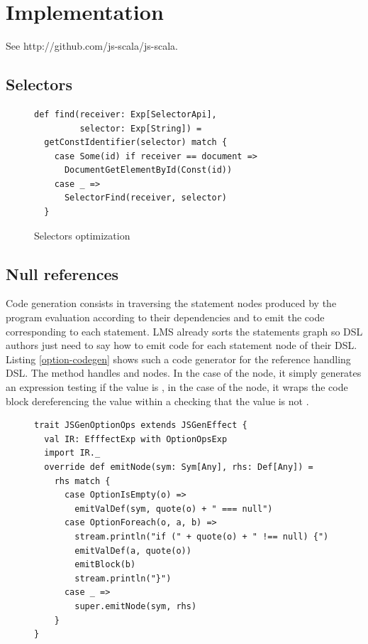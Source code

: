 \documentclass[preprint]{sigplanconf}
\begin{document}
\section{Implementation}
\label{implementation}

See http://github.com/js-scala/js-scala.

\subsection{Selectors}

\begin{figure}
\label{selector-impl}
\begin{lstlisting}
def find(receiver: Exp[SelectorApi],
         selector: Exp[String]) =
  getConstIdentifier(selector) match {
    case Some(id) if receiver == document =>
      DocumentGetElementById(Const(id))
    case _ =>
      SelectorFind(receiver, selector)
  }
\end{lstlisting}
\caption{Selectors optimization}
\end{figure}

\subsection{Null references}

Code generation consists in traversing the statement nodes produced by the program evaluation according to their
dependencies and to emit the code corresponding to each statement. LMS already sorts the statements graph so DSL
authors just need to say how to emit code for each statement node of their DSL. Listing \ref{option-codegen} shows
such a code generator for the  reference handling DSL. The  method handles
 and  nodes. In the case of the  node, it simply
generates an expression testing if the value is , in the case of the  node, it wraps
the code block dereferencing the value within a  checking that the value is not .

\begin{figure}
\begin{lstlisting}[caption=Null reference handling DSL code generator,label=option-codegen]
trait JSGenOptionOps extends JSGenEffect {
  val IR: EfffectExp with OptionOpsExp
  import IR._
  override def emitNode(sym: Sym[Any], rhs: Def[Any]) =
    rhs match {
      case OptionIsEmpty(o) =>
        emitValDef(sym, quote(o) + " === null")
      case OptionForeach(o, a, b) =>
        stream.println("if (" + quote(o) + " !== null) {")
        emitValDef(a, quote(o))
        emitBlock(b)
        stream.println("}")
      case _ =>
        super.emitNode(sym, rhs)
    }
}
\end{lstlisting}
\end{figure}
\end{document}
